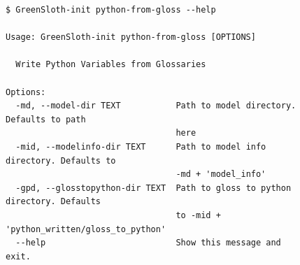 \begin{figure}
\begin{lstlisting}[style=bashstyle, caption={\textbf{The python-from-gloss command of the CLI of \greensloth[GreenSlothUtils]}}, label={code:greenslothutils-python-from-gloss}]
$ GreenSloth-init python-from-gloss --help

Usage: GreenSloth-init python-from-gloss [OPTIONS]

  Write Python Variables from Glossaries

Options:
  -md, --model-dir TEXT           Path to model directory. Defaults to path
                                  here
  -mid, --modelinfo-dir TEXT      Path to model info directory. Defaults to
                                  -md + 'model_info'
  -gpd, --glosstopython-dir TEXT  Path to gloss to python directory. Defaults
                                  to -mid + 'python_written/gloss_to_python'
  --help                          Show this message and exit.

\end{lstlisting}
\end{figure}

